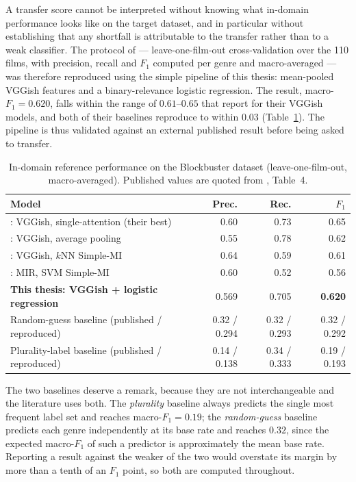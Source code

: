 A transfer score cannot be interpreted without knowing what in-domain performance looks
like on the target dataset, and in particular without establishing that any shortfall is
attributable to the transfer rather than to a weak classifier. The protocol of
\citet{ma2021computational} --- leave-one-film-out cross-validation over the 110 films,
with precision, recall and $F_1$ computed per genre and macro-averaged --- was therefore
reproduced using the simple pipeline of this thesis: mean-pooled VGGish features and a
binary-relevance logistic regression. The result, macro-$F_1 = 0.620$, falls within the
range of $0.61$--$0.65$ that \citeauthor{ma2021computational} report for their VGGish
models, and both of their baselines reproduce to within $0.03$
(Table~\ref{tab:blockbuster_reference}). The pipeline is thus validated against an
external published result before being asked to transfer.

\begin{table}[t]
  \centering
  \caption{In-domain reference performance on the Blockbuster dataset
    (leave-one-film-out, macro-averaged). Published values are quoted from
    \citet{ma2021computational}, Table~4.}
  \label{tab:blockbuster_reference}
  \begin{tabular}{lrrr}
    \hline
    Model & Prec. & Rec. & $F_1$ \\
    \hline
    \citeauthor{ma2021computational}: VGGish, single-attention (their best) & 0.60 & 0.73 & 0.65 \\
    \citeauthor{ma2021computational}: VGGish, average pooling               & 0.55 & 0.78 & 0.62 \\
    \citeauthor{ma2021computational}: VGGish, $k$NN Simple-MI               & 0.64 & 0.59 & 0.61 \\
    \citeauthor{ma2021computational}: MIR, SVM Simple-MI                    & 0.60 & 0.52 & 0.56 \\
    \textbf{This thesis: VGGish + logistic regression}          & 0.569 & 0.705 & \textbf{0.620} \\
    \hline
    Random-guess baseline (published / reproduced)              & 0.32 / 0.294 & 0.32 / 0.293 & 0.32 / 0.292 \\
    Plurality-label baseline (published / reproduced)           & 0.14 / 0.138 & 0.34 / 0.333 & 0.19 / 0.193 \\
    \hline
  \end{tabular}
\end{table}

The two baselines deserve a remark, because they are not interchangeable and the
literature uses both. The \emph{plurality} baseline always predicts the single most
frequent label set and reaches macro-$F_1 = 0.19$; the \emph{random-guess} baseline
predicts each genre independently at its base rate and reaches $0.32$, since the expected
macro-$F_1$ of such a predictor is approximately the mean base rate. Reporting a result
against the weaker of the two would overstate its margin by more than a tenth of an $F_1$
point, so both are computed throughout.

